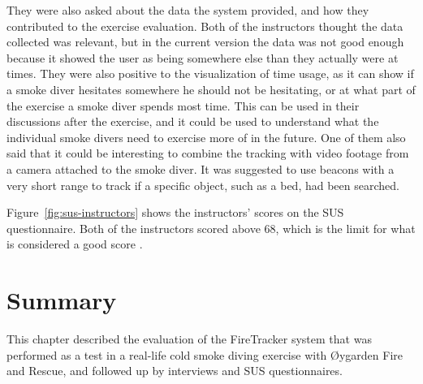 \documentclass[../Main/thesis.tex]{subfiles}
\begin{document}
They were also asked about the data the system provided, and how they contributed to the exercise evaluation.
Both of the instructors thought the data collected was relevant, but in the current version the data was not good enough because it showed the user as being somewhere else than they actually were at times.
They were also positive to the visualization of time usage, as it can show if a smoke diver hesitates somewhere he should not be hesitating, or at what part of the exercise a smoke diver spends most time.
This can be used in their discussions after the exercise, and it could be used to understand what the individual smoke divers need to exercise more of in the future.
One of them also said that it could be interesting to combine the tracking with video footage from a camera attached to the smoke diver.
It was suggested to use beacons with a very short range to track if a specific object, such as a bed, had been searched.

Figure~\ref{fig:sus-instructors} shows the instructors' scores on the SUS questionnaire.
Both of the instructors scored above 68, which is the limit for what is considered a good score \citep{Brooke2013}.


\section{Summary}
This chapter described the evaluation of the FireTracker system that was performed as a test in a real-life cold smoke diving exercise with Øygarden Fire and Rescue, and followed up by interviews and SUS questionnaires.
\end{document}
